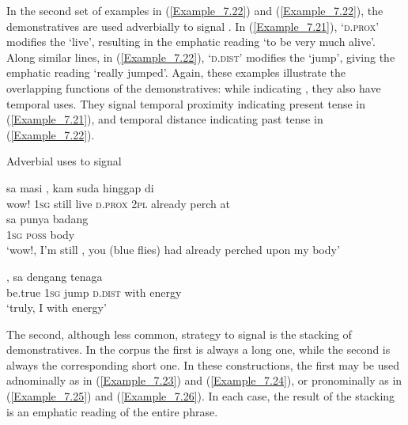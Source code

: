 {In the second set of examples in (\ref{Example_7.22}) and (\ref{Example_7.22}), the demonstratives are used adverbially to signal . In (\ref{Example_7.21}),  ‘\textsc{d.prox}’ modifies the   ‘live’, resulting in the emphatic reading  ‘to be very much alive’. Along similar lines, in (\ref{Example_7.22}),  ‘\textsc{d.dist}’ modifies the   ‘jump’, giving the emphatic reading  ‘really jumped’. Again, these examples illustrate the overlapping functions of the demonstratives: while indicating , they also have temporal uses. They signal temporal proximity indicating present tense in (\ref{Example_7.21}), and temporal distance indicating past tense in (\ref{Example_7.22}).


\begin{styleExampleTitle}
Adverbial uses to signal 
\end{styleExampleTitle}

\ea
\label{Example_7.21}
 {sa} {{masi}} {} {,} {kam} {suda} {hinggap} {di}\\ %
 {wow!}  \textsc{1sg}  {still}  live  \textsc{d.prox}  \textsc{2pl}  already  perch  at\\
\gll  sa  {punya}  {badang}\\
\textsc{1sg}  {\textsc{poss}}  {body}\\
 ‘wow!, I’m still , you (blue flies) had already perched upon my body’ \textstyleExampleSource{[080919-005-Cv.0015]}
\z

\ea
\label{Example_7.22}
, {sa} {} {} {dengang} {tenaga}\\ %
 be.true  \textsc{1sg}  jump  \textsc{d.dist}  with  energy\\
\glt 
‘truly, I  with energy’ \textstyleExampleSource{[081025-006-Cv.0218]}
\z


The second, although less common, strategy to signal  is the stacking of demonstratives. In the corpus the first  is always a long one, while the second is always the corresponding short one. In these constructions, the first  may be used adnominally as in (\ref{Example_7.23}) and (\ref{Example_7.24}), or pronominally as in (\ref{Example_7.25}) and (\ref{Example_7.26}). In each case, the result of the stacking is an emphatic reading of the entire  phrase.



}
